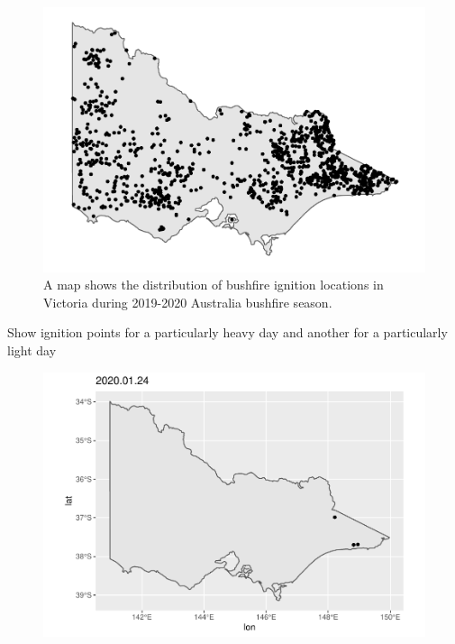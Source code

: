 \begin{Schunk}
\begin{figure}

{\centering \includegraphics[width=0.8\linewidth]{clustering_paper_files/figure-latex/clusteringfinalresults-1} 

}

\caption[A map shows the distribution of bushfire ignition locations in Victoria during 2019-2020 Australia bushfire season]{A map shows the distribution of bushfire ignition locations in Victoria during 2019-2020 Australia bushfire season.}\label{fig:clusteringfinalresults}
\end{figure}
\end{Schunk}

Show ignition points for a particularly heavy day and another for a
particularly light day

\begin{Schunk}
\begin{figure}

{\centering \includegraphics[width=0.8\linewidth]{clustering_paper_files/figure-latex/app2-1} 

}

\end{figure}
\end{Schunk}

